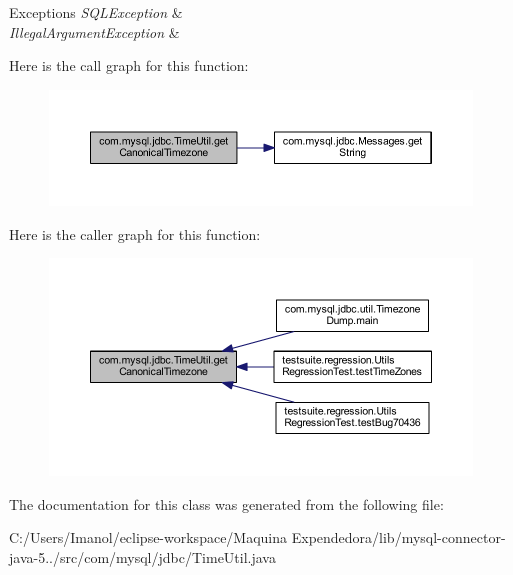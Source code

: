 \begin{DoxyExceptions}{Exceptions}
{\em S\+Q\+L\+Exception} & \\
\hline
{\em Illegal\+Argument\+Exception} & \\
\hline
\end{DoxyExceptions}
Here is the call graph for this function\+:
\nopagebreak
\begin{figure}[H]
\begin{center}
\leavevmode
\includegraphics[width=350pt]{classcom_1_1mysql_1_1jdbc_1_1_time_util_a0b298be0053e240dace4c16d7c1bea14_cgraph}
\end{center}
\end{figure}
Here is the caller graph for this function\+:
\nopagebreak
\begin{figure}[H]
\begin{center}
\leavevmode
\includegraphics[width=350pt]{classcom_1_1mysql_1_1jdbc_1_1_time_util_a0b298be0053e240dace4c16d7c1bea14_icgraph}
\end{center}
\end{figure}


The documentation for this class was generated from the following file\+:\begin{DoxyCompactItemize}
\item 
C\+:/\+Users/\+Imanol/eclipse-\/workspace/\+Maquina Expendedora/lib/mysql-\/connector-\/java-\/5../src/com/mysql/jdbc/Time\+Util.\+java\end{DoxyCompactItemize}
